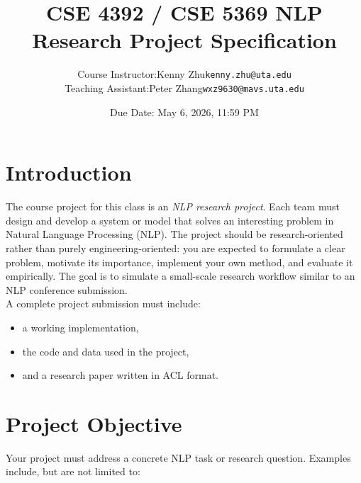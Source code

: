 \documentclass{article}
\title{
  \textbf{CSE 4392 / CSE 5369 NLP Research Project Specification} \\
}
\author{
  \normalsize
  \begin{tabular}{rcl}
    Course Instructor: & Kenny Zhu & \texttt{kenny.zhu@uta.edu} \\
    Teaching Assistant: & Peter Zhang & \texttt{wxz9630@mavs.uta.edu} \\
  \end{tabular}
}
\date{Due Date: May 6, 2026, 11:59 PM}
\begin{document}
\maketitle


\section{Introduction}

The course project for this class is an \emph{NLP research project}.
Each team must design and develop a system or model
that solves an interesting problem in Natural Language Processing (NLP).
The project should be research-oriented rather than purely engineering-oriented:
you are expected to formulate a clear problem, motivate its importance, implement
your own method, and evaluate it empirically. The goal is to simulate a small-scale research workflow similar to an NLP conference submission.\\

\noindent A complete project submission must include:
\begin{itemize}
  \item a working implementation,
  \item the code and data used in the project,
  \item and a research paper written in ACL format.
\end{itemize}



\section{Project Objective}

Your project must address a concrete NLP task or research question.
Examples include, but are not limited to:
\end{document}
